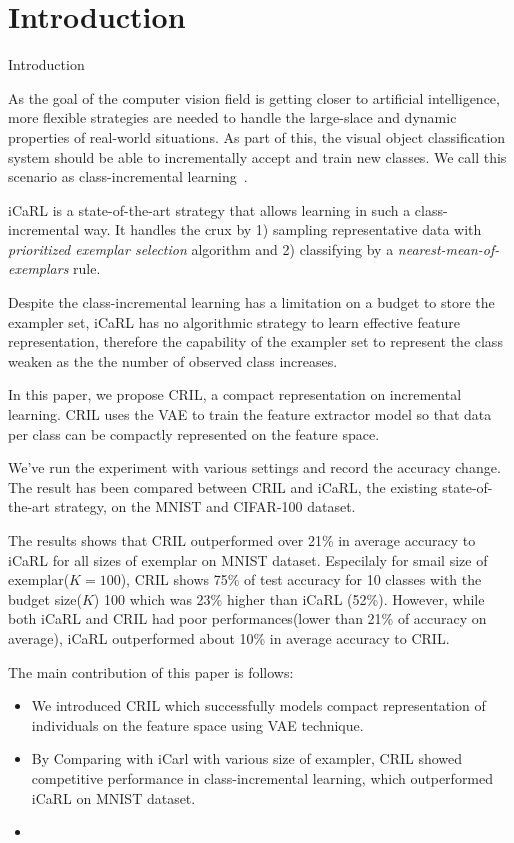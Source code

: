 \section{Introduction}
\label{sec:introduction}

Introduction

As the goal of the computer vision field is getting closer to artificial intelligence, more flexible strategies are needed to handle the large-slace and dynamic properties of real-world situations. As part of this, the visual object classification system should be able to incrementally accept and train new classes. We call this scenario as class-incremental learning~\cite{Rebuffi:2016aa}.

iCaRL is a state-of-the-art strategy that allows learning in such a class-incremental way. It handles the crux by 1) sampling representative data with \textit{prioritized exemplar selection} algorithm and 2) classifying by a \textit{nearest-mean-of-exemplars} rule.

Despite the class-incremental learning has a limitation on a budget to store the exampler set, iCaRL has no algorithmic strategy to learn effective feature representation, therefore the capability of the exampler set to represent the class weaken as the the number of observed class increases.

In this paper, we propose CRIL, a compact representation on incremental learning. CRIL uses the VAE to train the feature extractor model so that data per class can be compactly represented on the feature space.

We've run the experiment with various settings and record the accuracy change. The result has been compared between CRIL and iCaRL, the existing state-of-the-art strategy, on the MNIST and CIFAR-100 dataset.

The results shows that CRIL outperformed over 21\% in average accuracy to iCaRL for all sizes of exemplar on MNIST dataset. Especilaly for smail size of exemplar($K=100$), CRIL shows 75\% of test accuracy for 10 classes with the budget size($K$) 100 which was 23\% higher than iCaRL (52\%). However, while both iCaRL and CRIL had poor performances(lower than 21\% of accuracy on average), iCaRL outperformed about 10\% in average accuracy to CRIL.

The main contribution of this paper is follows:
\begin{itemize}
\item We introduced CRIL which successfully models compact representation of individuals on the feature space using VAE technique.
\item By Comparing with iCarl with various size of exampler, CRIL showed competitive performance in class-incremental learning, which outperformed iCaRL on MNIST dataset.
\item {}
\end{itemize}
